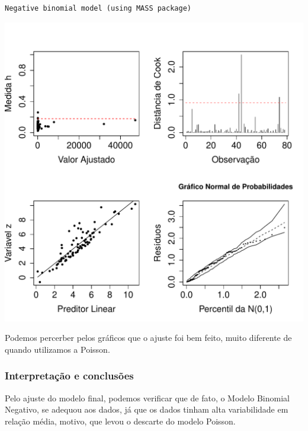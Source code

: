 \documentclass[12pt,a4paper]{article}\usepackage[]{graphicx}\usepackage[]{color}
\makeatletter
\def\maxwidth{ %
  \ifdim\Gin@nat@width>\linewidth
    \linewidth
  \else
    \Gin@nat@width
  \fi
}
\newenvironment{kframe}{%
 \def\at@end@of@kframe{}%
 \ifinner\ifhmode%
  \def\at@end@of@kframe{\end{minipage}}%
  \begin{minipage}{\columnwidth}%
 \fi\fi%
 \def\FrameCommand##1{\hskip\@totalleftmargin \hskip-\fboxsep
 \colorbox{shadecolor}{##1}\hskip-\fboxsep
     \hskip-\linewidth \hskip-\@totalleftmargin \hskip\columnwidth}%
 \MakeFramed {\advance\hsize-\width
   \@totalleftmargin\z@ \linewidth\hsize
   \@setminipage}}%
 {\par\unskip\endMakeFramed%
 \at@end@of@kframe}
\newenvironment{knitrout}{}{} %
\makeatother
\begin{document}
\begin{knitrout}
\color{fgcolor}\begin{kframe}
\begin{verbatim}
Negative binomial model (using MASS package) 
\end{verbatim}
\end{kframe}
\includegraphics[width=\maxwidth]{figure/unnamed-chunk-31-1} 

\end{knitrout}
Podemos percerber pelos gráficos que o ajuste foi bem feito, muito diferente de quando utilizamos a Poisson.
\subsubsection{\textbf{Interpretação e conclusões}}
Pelo ajuste do modelo final, podemos verificar que de fato, o Modelo Binomial Negativo, se adequou aos dados, já que os dados tinham alta variabilidade em relação média, motivo, que levou o descarte do modelo Poisson.
\end{document}
